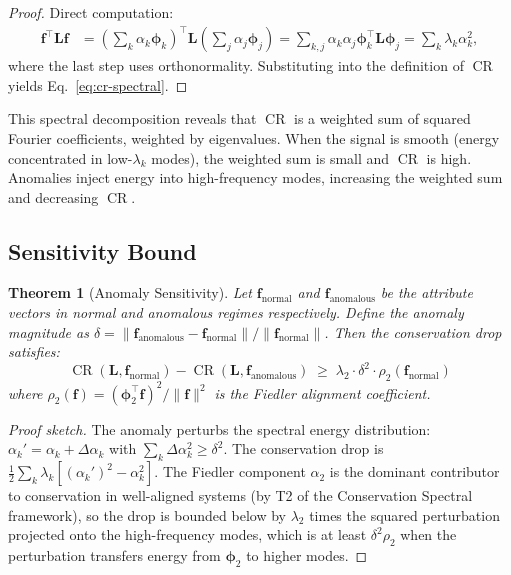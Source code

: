 \documentclass[11pt,a4paper]{article}
\newtheorem{theorem}{Theorem}[section]
\newcommand{\bff}{\mathbf{f}}
\newcommand{\bL}{\mathbf{L}}
\newcommand{\bphi}{\boldsymbol{\phi}}
\DeclareMathOperator{\CR}{CR}
\begin{document}
\begin{proof}
Direct computation:
\begin{align}
  \bff^\top \bL \bff &= \left(\sum_k \alpha_k \bphi_k\right)^\top
    \bL \left(\sum_j \alpha_j \bphi_j\right)
    = \sum_{k,j} \alpha_k \alpha_j \bphi_k^\top \bL \bphi_j
    = \sum_k \lambda_k \alpha_k^2,
\end{align}
where the last step uses orthonormality.  Substituting into the definition of
$\CR$ yields Eq.~\eqref{eq:cr-spectral}.
\end{proof}

This spectral decomposition reveals that $\CR$ is a weighted sum of squared
Fourier coefficients, weighted by eigenvalues.  When the signal is smooth (energy
concentrated in low-$\lambda_k$ modes), the weighted sum is small and $\CR$ is
high.  Anomalies inject energy into high-frequency modes, increasing the weighted
sum and decreasing $\CR$.

\subsection{Sensitivity Bound}

\begin{theorem}[Anomaly Sensitivity]\label{thm:sensitivity}
Let $\bff_{\mathrm{normal}}$ and $\bff_{\mathrm{anomalous}}$ be the attribute
vectors in normal and anomalous regimes respectively.  Define the anomaly
magnitude as $\delta = \|\bff_{\mathrm{anomalous}} - \bff_{\mathrm{normal}}\| /
\|\bff_{\mathrm{normal}}\|$.  Then the conservation drop satisfies:
\begin{equation}\label{eq:sensitivity}
  \CR(\bL, \bff_{\mathrm{normal}}) - \CR(\bL, \bff_{\mathrm{anomalous}})
  \;\geq\; \lambda_2 \cdot \delta^2 \cdot \rho_2(\bff_{\mathrm{normal}})
\end{equation}
where $\rho_2(\bff) = (\bphi_2^\top \bff)^2 / \|\bff\|^2$ is the Fiedler
alignment coefficient.
\end{theorem}

\begin{proof}[Proof sketch]
The anomaly perturbs the spectral energy distribution:
$\alpha_k' = \alpha_k + \Delta\alpha_k$ with $\sum_k \Delta\alpha_k^2 \geq \delta^2$.
The conservation drop is $\frac{1}{2}\sum_k \lambda_k[(\alpha_k')^2 - \alpha_k^2]$.
The Fiedler component $\alpha_2$ is the dominant contributor to conservation in
well-aligned systems (by T2 of the Conservation Spectral framework), so the
drop is bounded below by $\lambda_2$ times the squared perturbation projected
onto the high-frequency modes, which is at least $\delta^2 \rho_2$ when the
perturbation transfers energy from $\bphi_2$ to higher modes.
\end{proof}
\end{document}
